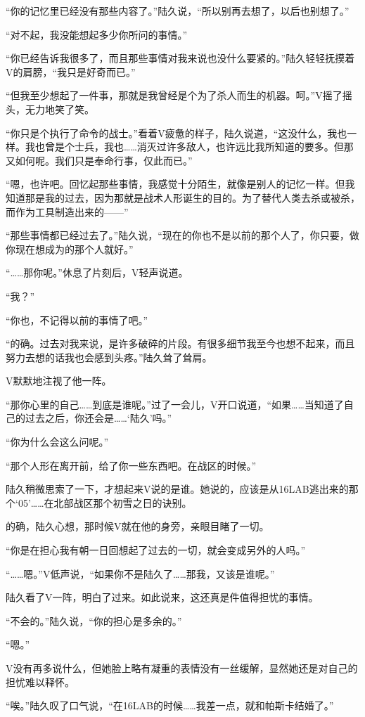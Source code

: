 “你的记忆里已经没有那些内容了。”陆久说，“所以别再去想了，以后也别想了。”

“对不起，我没能想起多少你所问的事情。”

“你已经告诉我很多了，而且那些事情对我来说也没什么要紧的。”陆久轻轻抚摸着V的肩膀，“我只是好奇而已。”

“但我至少想起了一件事，那就是我曾经是个为了杀人而生的机器。呵。”V摇了摇头，无力地笑了笑。

“你只是个执行了命令的战士。”看着V疲惫的样子，陆久说道，“这没什么，我也一样。我也曾是个士兵，我也……消灭过许多敌人，也许远比我所知道的要多。但那又如何呢。我们只是奉命行事，仅此而已。”

“嗯，也许吧。回忆起那些事情，我感觉十分陌生，就像是别人的记忆一样。但我知道那是我的过去，因为那就是战术人形诞生的目的。为了替代人类去杀或被杀，而作为工具制造出来的——”

“那些事情都已经过去了。”陆久说，“现在的你也不是以前的那个人了，你只要，做你现在想成为的那个人就好。”

“……那你呢。”休息了片刻后，V轻声说道。

“我？”

“你也，不记得以前的事情了吧。”

“的确。过去对我来说，是许多破碎的片段。有很多细节我至今也想不起来，而且努力去想的话我也会感到头疼。”陆久耸了耸肩。

V默默地注视了他一阵。

“那你心里的自己……到底是谁呢。”过了一会儿，V开口说道，“如果……当知道了自己的过去之后，你还会是……‘陆久’吗。”

“你为什么会这么问呢。”

“那个人形在离开前，给了你一些东西吧。在战区的时候。”

陆久稍微思索了一下，才想起来V说的是谁。她说的，应该是从16LAB逃出来的那个‘05’……在北部战区那个初雪之日的诀别。

的确，陆久心想，那时候V就在他的身旁，亲眼目睹了一切。

“你是在担心我有朝一日回想起了过去的一切，就会变成另外的人吗。”

“……嗯。”V低声说，“如果你不是陆久了……那我，又该是谁呢。”

陆久看了V一阵，明白了过来。如此说来，这还真是件值得担忧的事情。

“不会的。”陆久说，“你的担心是多余的。”

“嗯。”

V没有再多说什么，但她脸上略有凝重的表情没有一丝缓解，显然她还是对自己的担忧难以释怀。

“唉。”陆久叹了口气说，“在16LAB的时候……我差一点，就和帕斯卡结婚了。”


